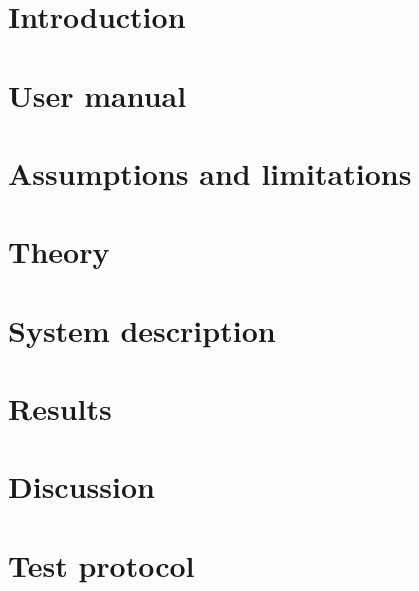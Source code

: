 \documentclass[10pt, titlepage, oneside, a4paper]{article}
\newcommand{\Section}[1]{\section{#1}\vspace{-8pt}}
\begin{document}
    \newpage


    \setlength{\parindent}{0pt}
    \setlength{\parskip}{10pt}

    	\Section{Introduction}
		

	\Section{User manual}
		
	
	\Section{Assumptions and limitations}
		

	\Section{Theory}
		

	\Section{System description}
		
		
	\Section{Results}
		
		
	\Section{Discussion}
		

\appendix
	\Section{Test protocol}
		
\end{document}
